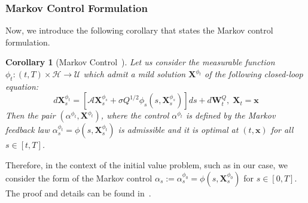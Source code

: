 \documentclass[nohyperref]{article}
\theoremstyle{plain}
\newtheorem{corollary}[theorem]{Corollary}
\theoremstyle{remark}
\newcommand{\mc}{\mathcal}
\newcommand{\mb}{\mathbf}
\begin{document}
\subsubsection{Markov Control Formulation}\label{subsection:Markov Control}

Now, we introduce the following corollary that states the Markov control formulation.
\begin{corollary}[Markov Control~\citep{fabbri2017stochastic}]\label{corollary:markov control} Let us consider the measurable function $\phi_t : (t, T) \times \mc{H} \to \mc{U}$ which admit a mild solution $\mb{X}^{\phi_t}$ of the following closed-loop equation:
\begin{equation}
    d\mathbf{X}^{\phi_t}_{s} = \left[\mc{A}\mb{X}^{\phi_s}_s + \sigma Q^{1/2}\phi_s(s, \mb{X}^{\phi_s}_s)\right]ds + d\mb{W}_t^Q, \; \mb{X}_t = \mb{x}
\end{equation}
Then the pair $(\alpha^{\phi_t}, \mb{X}^{\phi_t})$, where the control $\alpha^{\phi_t}$ is defined by the Markov feedback law $\alpha^{\phi_t}_s = \phi(s, \mb{X}^{\phi_t}_s)$ is admissible and it is optimal at $(t, \mb{x})$ for all $s \in [t, T]$.
\end{corollary}
Therefore, in the context of the initial value problem, such as in our case, we consider the form of the Markov control $\alpha_s := \alpha^{\phi_0}_s = \phi(s, \mb{X}^{\phi_0}_s)$ for $s \in [0, T]$. The proof and details can be found in~\citep[Chap~2.5.1]{fabbri2017stochastic}.
\end{document}
